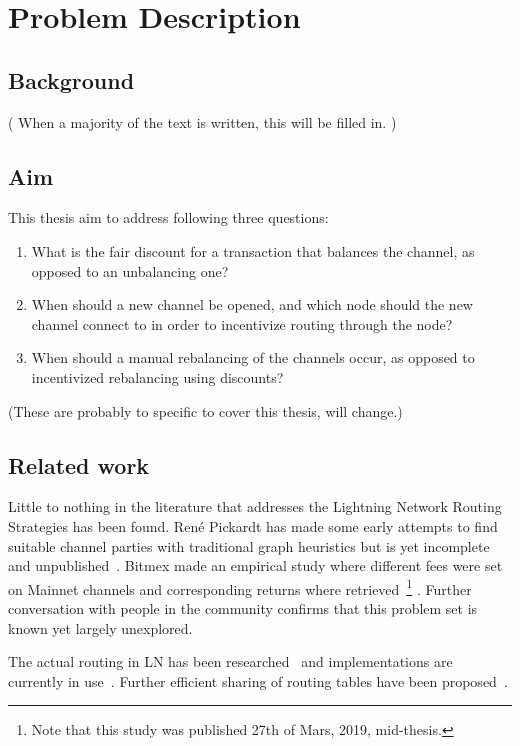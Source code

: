 \chapter{Problem Description}

\section{Background}
    \label{sec:background}

	( When a majority of the text is written, this will be filled in. )

\section{Aim}
    \label{sec:aim}

This thesis aim to address following three questions:

    \begin{enumerate}
	\item What is the fair discount for a transaction that balances the channel, as
		opposed to an unbalancing one?
	\item When should a new channel be opened, and which node should the new
		channel connect to in order to incentivize routing through the node?
	\item When should a manual rebalancing of the channels occur, as opposed to
		incentivized rebalancing using discounts?
    \end{enumerate}
	(These are probably to specific to cover this thesis, will change.)
	
\section{Related work}
    \label{sec:related_work}

	Little to nothing in the literature that addresses the Lightning Network Routing Strategies has been found. René Pickardt has made some early attempts to find suitable channel parties with traditional graph heuristics but is yet incomplete and unpublished~\cite{repository:rene:pickard}. Bitmex made an empirical study where different fees were set on Mainnet channels and corresponding returns where retrieved~\cite{bitmex:fee}\footnote{Note that this study was published 27th of Mars, 2019, mid-thesis.} . Further conversation with people in the community confirms that this problem set is known yet largely unexplored.
	
	The actual routing in LN has been researched~\cite{distasi:avallone:cononico:routing} and implementations are currently in use~\cite{repository:clightning, repository:lnd, repository:eclair, repository:lit}. Further efficient sharing of routing tables have been proposed~\cite{gunspan:marco:ant}.
	
